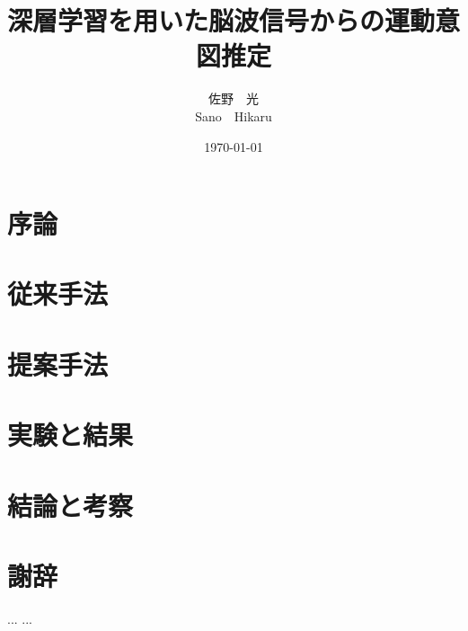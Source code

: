 \documentclass[a4paper,11pt,oneside,openany]{jsbook}
\title{深層学習を用いた脳波信号からの運動意図推定}
\author{佐野\ \ 光 \\ Sano\ \ Hikaru}
\date{\today}
\begin{document}
%


%
\maketitle
%
%
\frontmatter
% 
\setcounter{tocdepth}{2}
\tableofcontents
%
%
\mainmatter

\chapter{序論}


\chapter{従来手法}







\chapter{提案手法}


\chapter{実験と結果}

\chapter{結論と考察}
%
%
\appendix
%

%
%
\chapter*{謝辞}
...
...
\end{document}
